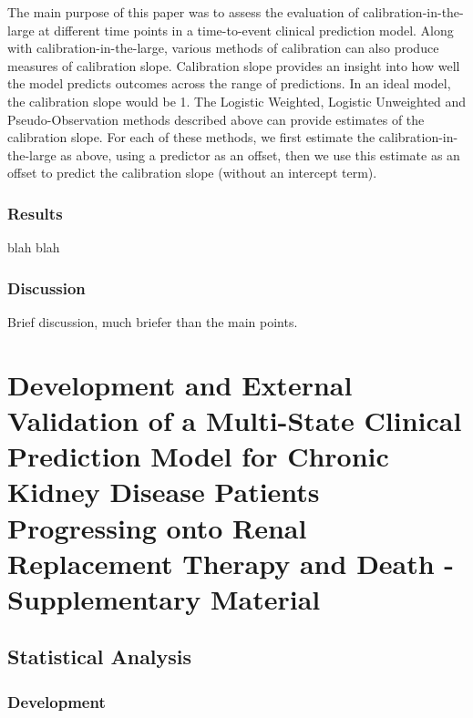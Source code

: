 \documentclass[12pt,PhD,twoside,openright]{muthesis}
\begin{document}
The main purpose of this paper was to assess the evaluation of calibration-in-the-large at different time points in a time-to-event clinical prediction model. Along with calibration-in-the-large, various methods of calibration can also produce measures of calibration slope. Calibration slope provides an insight into how well the model predicts outcomes across the range of predictions. In an ideal model, the calibration slope would be 1. The Logistic Weighted, Logistic Unweighted and Pseudo-Observation methods described above can provide estimates of the calibration slope. For each of these methods, we first estimate the calibration-in-the-large as above, using a predictor as an offset, then we use this estimate as an offset to predict the calibration slope (without an intercept term).

\hypertarget{results-3}{%
\subsection{Results}\label{results-3}}

blah blah

\hypertarget{discussion-3}{%
\subsection{Discussion}\label{discussion-3}}

Brief discussion, much briefer than the main points.

\hypertarget{chap-dev-paper-supp}{%
\chapter{Development and External Validation of a Multi-State Clinical Prediction Model for Chronic Kidney Disease Patients Progressing onto Renal Replacement Therapy and Death - Supplementary Material}\label{chap-dev-paper-supp}}

\hypertarget{statistical-analysis}{%
\section{Statistical Analysis}\label{statistical-analysis}}

\hypertarget{development}{%
\subsection{Development}\label{development}}
\end{document}
